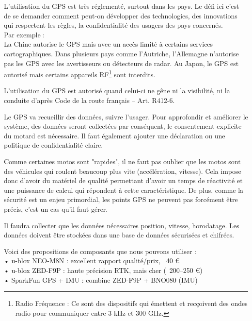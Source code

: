 L'utilisation du GPS est très réglementé, surtout dans les pays. Le défi ici c'est de se demander comment peut-on développer des technologies, des innovations qui respectent les règles, la confidentialité des usagers des pays concernés.\\

Par exemple :\\
La Chine autorise le GPS mais avec un accès limité à certains services cartographiques. Dans plusieurs pays comme l'Autriche, l'Allemagne n'autorise pas les GPS avec les avertisseurs ou détecteurs de radar. Au Japon, le GPS est autorisé mais certains appareils RF\footnote{Radio Fréquence : Ce sont des dispositifs qui émettent et recçoivent des ondes radio pour communiquer entre 3 kHz et 300 GHz.} sont interdits.


L'utilisation du GPS est autorisé quand celui-ci ne gêne ni la visibilité, ni la conduite d'après Code de la route français – Art. R412-6\cite{loi_code_de_la_route}.

Le GPS va recueillir des données, suivre l'usager. Pour approfondir et améliorer le système, des données seront collectées par conséquent, le consentement explicite du motard est nécessaire. Il faut également ajouter une déclaration ou une politique de confidentialité claire.

Comme certaines motos sont "rapides", il ne faut pas oublier que les motos sont des véhicules qui roulent beaucoup plus vite (accélération, vitesse). Cela impose donc d'avoir du matériel de qualité permettant d'avoir un temps de réactivité et une puissance de calcul qui répondent à cette caractéristique. De plus, comme la sécurité est un enjeu primordial, les points GPS ne peuvent pas forcément être précis, c'est un cas qu'il faut gérer.

Il faudra collecter que les données nécessaires position, vitesse, horodatage. Les données doivent être stockées dans une base de données sécurisées et chifrées.

Voici des propositions de composants que nous pouvons utiliser : 	\\
•	u-blox NEO-M8N : excellent rapport qualité/prix, ~40 € \\
•	u-blox ZED-F9P : haute précision RTK, mais cher (~200–250 €) \\
•	SparkFun GPS + IMU : combine ZED-F9P + BNO080 (IMU)\\




